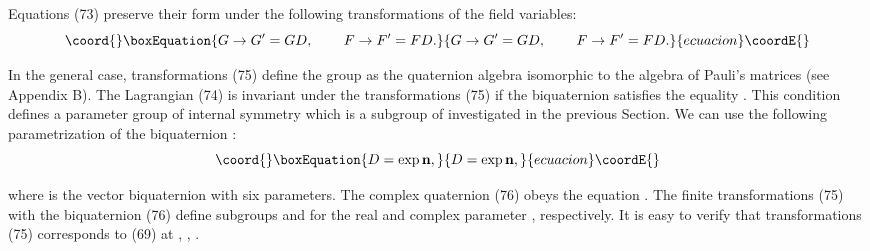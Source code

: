 \documentclass[a4paper,12pt]{article}
\begin{document}
Equations (73) preserve their form under the following transformations of
the field variables:
\begin{equation}\coord{}\boxEquation{
G\rightarrow G^{\prime }=GD,\hspace{0.3in}F\rightarrow F^{\prime }=FD.
\label{75}
}{
G\rightarrow G^{\prime }=GD,\hspace{0.3in}F\rightarrow F^{\prime }=FD.
}{ecuacion}\coordE{}\end{equation}

In the general case, transformations (75) define the \coordHE{}
group as the quaternion algebra isomorphic to the algebra of
Pauli's matrices (see Appendix B). The Lagrangian (74) is
invariant under the transformations (75) if the biquaternion \coordHE{}
satisfies the equality \coordHE{}. This condition defines a
\coordHE{}parameter group of internal symmetry \coordHE{} which is a
subgroup of \coordHE{} investigated in the previous Section. We can
use the following parametrization of the biquaternion \coordHE{}:
\begin{equation}\coord{}\boxEquation{
D=\exp \mathbf{n},  \label{76}
}{
D=\exp \mathbf{n},  }{ecuacion}\coordE{}\end{equation}

where \coordHE{} is the vector biquaternion with six parameters.
The complex quaternion (76) obeys the equation \coordHE{}.
The finite transformations (75) with the biquaternion \coordHE{} (76)
define subgroups \coordHE{} and \coordHE{} for the real and complex
parameter \coordHE{}, respectively. It is easy to verify that
transformations (75) corresponds to (69) at \coordHE{},
\coordHE{},
\coordHE{}.
\end{document}
